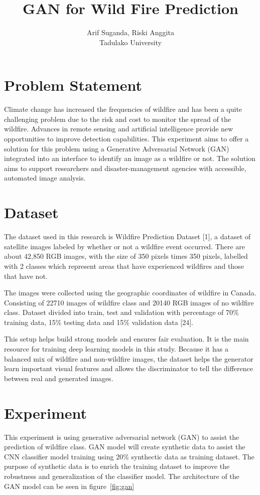 \documentclass[a4paper,10pt]{article}
\title{GAN for Wild Fire Prediction}
\author{Arif Suganda, Riski Anggita \\
        Tadulako University
}
\begin{document}
\maketitle
\section{Problem Statement}
Climate change has increased the frequencies of wildfire and has been a quite challenging problem due to the risk and cost to monitor the spread of the wildfire. 
Advances in remote sensing and artificial intelligence provide new opportunities to improve detection capabilities. 
This experiment aims to offer a solution for this problem using a Generative Adversarial Network (GAN) integrated into an interface to identify an image as a wildfire or not. 
The solution aims to support researchers and disaster-management agencies with accessible, automated image analysis. 
\section{Dataset}
The dataset used in this research is Wildfire Prediction Dataset [1], a dataset of satellite images labeled by whether or not a wildfire event occurred. 
There are about 42,850 RGB images, with the size of 350 pixels times 350 pixels, labelled with 2 classes which represent areas that have experienced wildfires and those that have not.

The images were collected using the geographic coordinates of wildfire in Canada. 
Consisting of 22710 images of wildfire class and 20140 RGB images of no wildfire class. 
Dataset divided into train, test and validation with percentage of 70\% training data, 15\% testing data and 15\% validation data [24].

This setup helps build strong models and ensures fair evaluation. It is the main resource for training deep learning models in this study. 
Because it has a balanced mix of wildfire and non-wildfire images, the dataset helps the generator learn important visual features and allows the discriminator to tell the difference between real and generated images.

\section{Experiment}
This experiment is using generative adversarial network (GAN) to assist the prediction of wildfire class.
GAN model will create synthetic data to assist the CNN classifier model training using 20\% synthectic data as training dataset.
The purpose of synthetic data is to enrich the training dataset to improve the robustness and generalization of the classifier model.
The architecture of the GAN model can be seen in figure~\ref*{fig:gan}
\end{document}
